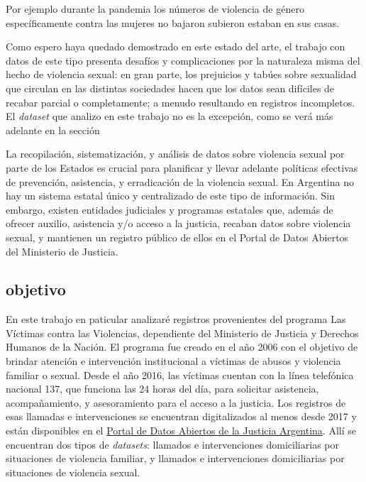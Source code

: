 \documentclass[10 pt]{article}
\begin{document}
Por ejemplo durante la pandemia los números de violencia de género específicamente contra las mujeres no bajaron subieron estaban en sus casas.

Como espero haya quedado demostrado en este estado del arte, el trabajo con datos de este tipo presenta desafíos y complicaciones por la naturaleza misma del hecho de violencia sexual: en gran parte, los prejuicios y tabúes sobre sexualidad que circulan en las distintas sociedades hacen que los datos sean difíciles de recabar parcial o completamente; a menudo resultando en registros incompletos. El \textit{dataset} que analizo en este trabajo no es la excepción, como se verá más adelante en la sección 

La  recopilación, sistematización, y análisis de datos sobre violencia sexual por parte de los Estados es crucial para planificar y llevar adelante políticas efectivas de prevención, asistencia, y erradicación de la violencia sexual. En Argentina no hay un sistema estatal único y centralizado de este tipo de información. Sin embargo, existen entidades judiciales y programas estatales que, además de ofrecer auxilio, asistencia y/o acceso a la justicia, recaban datos sobre violencia sexual, y mantienen un registro público de ellos en el Portal de Datos Abiertos del Ministerio de Justicia.

\subsection*{objetivo}



En este trabajo en paticular analizaré registros provenientes del programa Las Víctimas contra las Violencias, dependiente del Ministerio de Justicia y Derechos Humanos de la Nación. El programa fue creado en el año 2006 con el objetivo de brindar atención e intervención institucional a víctimas de abusos y violencia familiar o sexual. Desde el año 2016, las víctimas cuentan con la línea telefónica nacional 137, que funciona las 24 horas del día, para solicitar asistencia, acompañamiento, y asesoramiento para el acceso a la justicia. Los registros de esas llamadas e intervenciones se encuentran digitalizados al menos desde 2017 y están disponibles en el \href{http://datos.jus.gob.ar/}{Portal de Datos Abiertos de la Justicia Argentina}. Allí se encuentran dos tipos de \textit{datasets}: llamados e intervenciones domiciliarias por situaciones de violencia familiar, y llamados e intervenciones domiciliarias por situaciones de violencia sexual. 
\end{document}

